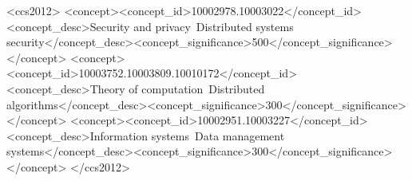 \documentclass[sigconf,anonymous,review]{acmart}
\begin{document}
\begin{CCSXML}
<ccs2012>
<concept><concept_id>10002978.10003022</concept_id><concept_desc>Security and privacy~Distributed systems security</concept_desc><concept_significance>500</concept_significance></concept>
<concept><concept_id>10003752.10003809.10010172</concept_id><concept_desc>Theory of computation~Distributed algorithms</concept_desc><concept_significance>300</concept_significance></concept>
<concept><concept_id>10002951.10003227</concept_id><concept_desc>Information systems~Data management systems</concept_desc><concept_significance>300</concept_significance></concept>
</ccs2012>
\end{CCSXML}


\maketitle




















\end{document}
